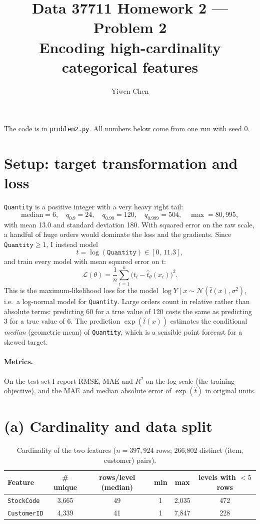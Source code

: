 \documentclass[11pt]{article}
\title{Data 37711 Homework 2 --- Problem 2\\
\large Encoding high-cardinality categorical features}
\author{Yiwen Chen}
\date{}
\begin{document}
\maketitle

The code is in \texttt{problem2.py}. All numbers below come from one run with seed 0.

\section*{Setup: target transformation and loss}

\texttt{Quantity} is a positive integer with a very heavy right tail:
\[
\text{median}=6,\quad q_{0.9}=24,\quad q_{0.99}=120,\quad q_{0.999}=504,\quad \max=80{,}995,
\]
with mean 13.0 and standard deviation 180. With squared error on the raw scale, a handful of
huge orders would dominate the loss and the gradients. Since $\texttt{Quantity}\ge1$, I instead
model
\[
 t = \log(\texttt{Quantity}) \in [0,\, 11.3],
\]
and train every model with mean squared error on $t$:
\[
 \mathcal L(\theta)=\frac1n\sum_{i=1}^n\bigl(t_i-\hat t_\theta(x_i)\bigr)^2 .
\]
This is the maximum-likelihood loss for the model
$\log Y\mid x\sim\mathcal N(\hat t(x),\sigma^2)$, i.e.\ a log-normal model for
\texttt{Quantity}. Large orders count in relative rather than absolute terms: predicting 60 for
a true value of 120 costs the same as predicting 3 for a true value of 6. The prediction
$\exp(\hat t(x))$ estimates the conditional \emph{median} (geometric mean) of \texttt{Quantity},
which is a sensible point forecast for a skewed target.

\paragraph{Metrics.} On the test set I report RMSE, MAE and $R^2$ on the log scale (the training
objective), and the MAE and median absolute error of $\exp(\hat t)$ in original units.

\section*{(a) Cardinality and data split}

\begin{table}[H]\centering
\begin{tabular}{lccccc}
\toprule
Feature & \# unique & rows/level (median) & min & max & levels with $<5$ rows\\
\midrule
\texttt{StockCode}  & 3{,}665 & 49 & 1 & 2{,}035 & 472\\
\texttt{CustomerID} & 4{,}339 & 41 & 1 & 7{,}847 & 228\\
\bottomrule
\end{tabular}
\caption{Cardinality of the two features ($n=397{,}924$ rows; 266{,}802 distinct
(item, customer) pairs).}
\end{table}
\end{document}
